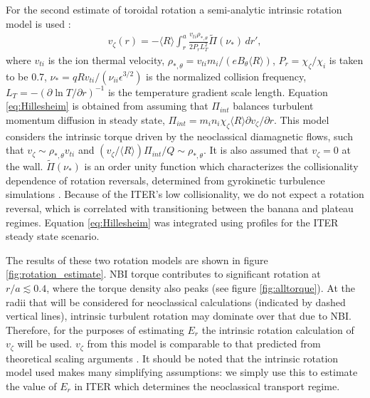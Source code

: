 \documentclass{article}
\begin{document}
For the second estimate of toroidal rotation a semi-analytic intrinsic rotation model is used \cite{Hillesheim2015}:
\begin{gather}
v_{\zeta}(r) = - \langle R \rangle \int_{r}^a \frac{v_{ti} \rho_{*,\theta}} {2 P_r L_T^2} \widetilde{\Pi} (\nu_*) \, d r',
\end{gather} \label{eq:Hillesheim}
where $v_{ti}$ is the ion thermal velocity, $\rho_{*,\theta} = v_{ti} m_i/(e B_{\theta} \langle R \rangle) $, $P_r = \chi_{\zeta}/\chi_i$ is taken to be 0.7, $\nu_* = q R v_{ti}/(\nu_{ii} \epsilon^{3/2})$ is the normalized collision frequency, $L_T = - \left( \partial \ln T/ \partial r \right)^{-1}$ is the temperature gradient scale length. Equation \ref{eq:Hillesheim} is obtained from assuming that $\Pi_{int}$ balances turbulent momentum diffusion in steady state, $\Pi_{int} = m_i n_i \chi_{\zeta} \langle R \rangle \partial v_{\zeta}/\partial r$. This model considers the intrinsic torque driven by the neoclassical diamagnetic flows, such that $v_{\zeta} \sim \rho_{*,\theta} v_{ti}$ and $(v_{\zeta}/\langle R \rangle) \Pi_{int}/Q \sim \rho_{*, \theta}$. It is also assumed that $v_{\zeta} = 0$ at the wall. %
$\widetilde{\Pi} (\nu_*)$ is an order unity function which characterizes the collisionality dependence of rotation reversals, determined from gyrokinetic turbulence simulations \cite{Barnes2013}. Because of the ITER's low collisionality, we do not expect a rotation reversal, which is correlated with transitioning between the banana and plateau regimes. 
Equation \ref{eq:Hillesheim} was integrated using profiles for the ITER steady state scenario. 

The results of these two rotation models are shown in figure \ref{fig:rotation_estimate}. NBI torque contributes to significant rotation at $r/a \lesssim 0.4$, where the torque density also peaks (see figure \ref{fig:alltorque}).  At the radii that will be considered for neoclassical calculations (indicated by dashed vertical lines), intrinsic turbulent rotation may dominate over that due to NBI. Therefore, for the purposes of estimating $E_r$ the intrinsic rotation calculation of $v_{\zeta}$ will be used. $v_{\zeta}$ from this model is comparable to that predicted from theoretical scaling arguments \cite{Parra2012}. It should be noted that the intrinsic rotation model used makes many simplifying assumptions: we simply use this to estimate the value of $E_r$ in ITER which determines the neoclassical transport regime. 

\FloatBarrier
\end{document}
